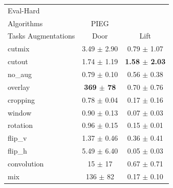 \begin{tabular}{lcc}
Eval-Hard & & \\
Algorithms & PIEG & \\
Tasks Augmentations & Door & Lift \\
cutmix          & 3.49 $\pm$ 2.90 & 0.79 $\pm$ 1.07 \\
cutout          & 1.74 $\pm$ 1.19 & \textbf{1.58 $\pm$ 2.03} \\
no\_aug         & 0.79 $\pm$ 0.10 & 0.56 $\pm$ 0.38 \\
overlay         & \textbf{369 $\pm$ 78} & 0.70 $\pm$ 0.76 \\
cropping        & 0.78 $\pm$ 0.04 & 0.17 $\pm$ 0.16 \\
window          & 0.90 $\pm$ 0.13 & 0.07 $\pm$ 0.03 \\
rotation        & 0.96 $\pm$ 0.15 & 0.15 $\pm$ 0.01 \\
flip\_v         & 1.37 $\pm$ 0.46 & 0.36 $\pm$ 0.41 \\
flip\_h         & 5.49 $\pm$ 6.40 & 0.05 $\pm$ 0.03 \\
convolution     & 15 $\pm$ 17 & 0.67 $\pm$ 0.71 \\
mix             & 136 $\pm$ 82 & 0.17 $\pm$ 0.10 \\
\end{tabular}